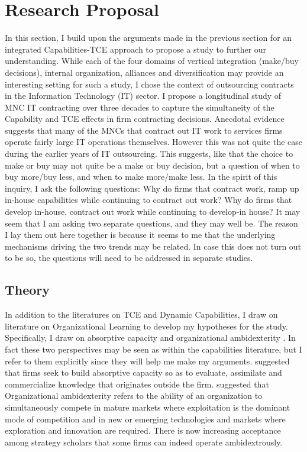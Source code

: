 \documentclass[12pt,letterpaper]{article}
\begin{document}
\section{Research Proposal}
In this section, I build upon the arguments made in the previous section for an integrated Capabilities-TCE approach to propose a study to further our understanding. While each of the four domains of vertical integration (make/buy decisions), internal organization, alliances and diversification may provide an interesting setting for such a study, I chose the context of outsourcing contracts in the Information Technology (IT) sector. I propose a longitudinal study of MNC IT contracting over three decades to capture the simultaneity of the Capability and TCE effects in firm contracting decisions. Anecdotal evidence suggests that many of the MNCs that contract out IT work to services firms operate fairly large IT operations themselves. However this was not quite the case during the earlier years of IT outsourcing. This suggests, like \cite{Parmigiani2007} that the choice to make or buy may not quite be a make or buy decision, but a question of when to buy more/buy less, and when to make more/make less. In the spirit of this inquiry, I ask the following questions: Why do firms that contract work, ramp up in-house capabilities while continuing to contract out work? Why do firms that develop in-house, contract out work while continuing to develop-in house? It may seem that I am asking two separate questions, and they may well be. The reason I lay them out here together is because it seems to me that the underlying mechanisms driving the two trends may be related. In case this does not turn out to be so, the questions will need to be addressed in separate studies.

\subsection{Theory}
In addition to the literatures on TCE and Dynamic Capabilities, I draw on literature on Organizational Learning to develop my hypotheses for the study. Specifically, I draw on absorptive capacity \citep{Cohen1990} and organizational ambidexterity \citep{OReilly2004, OReilly2008, Raisch2008}. In fact these two perspectives may be seen as within the capabilities literature, but I refer to them explicitly since they will help me make my arguments. \cite{Cohen1990} suggested that firms seek to build absorptive capacity so as to evaluate, assimilate and commercialize knowledge that originates outside the firm.  \cite{OReilly2004, OReilly2008} suggested that Organizational ambidexterity refers to the ability of an organization to simultaneously compete in mature markets where exploitation is the dominant mode of competition and in new or emerging technologies and markets where exploration and innovation are required. There is now increasing acceptance among strategy scholars that some firms can indeed operate ambidextrously. 
\end{document}
